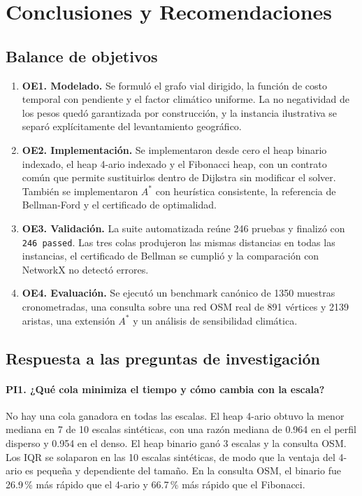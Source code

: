 \section{Conclusiones y Recomendaciones}
\label{sec:conclusiones}

\subsection{Balance de objetivos}
\begin{enumerate}
    \item \textbf{OE1. Modelado.} Se formuló el grafo vial dirigido, la función de costo temporal con pendiente y el factor climático uniforme. La no negatividad de los pesos quedó garantizada por construcción, y la instancia ilustrativa se separó explícitamente del levantamiento geográfico.
    \item \textbf{OE2. Implementación.} Se implementaron desde cero el heap binario indexado, el heap 4-ario indexado y el Fibonacci heap, con un contrato común que permite sustituirlos dentro de Dijkstra sin modificar el solver. También se implementaron $A^*$ con heurística consistente, la referencia de Bellman-Ford y el certificado de optimalidad.
    \item \textbf{OE3. Validación.} La suite automatizada reúne 246 pruebas y finalizó con \texttt{246 passed}. Las tres colas produjeron las mismas distancias en todas las instancias, el certificado de Bellman se cumplió y la comparación con NetworkX no detectó errores.
    \item \textbf{OE4. Evaluación.} Se ejecutó un benchmark canónico de 1350 muestras cronometradas, una consulta sobre una red OSM real de 891 vértices y 2139 aristas, una extensión $A^*$ y un análisis de sensibilidad climática.
\end{enumerate}

\subsection{Respuesta a las preguntas de investigación}
\paragraph{PI1. ¿Qué cola minimiza el tiempo y cómo cambia con la escala?} No hay una cola ganadora en todas las escalas. El heap 4-ario obtuvo la menor mediana en 7 de 10 escalas sintéticas, con una razón mediana de 0.964 en el perfil disperso y 0.954 en el denso. El heap binario ganó 3 escalas y la consulta OSM. Los IQR se solaparon en las 10 escalas sintéticas, de modo que la ventaja del 4-ario es pequeña y dependiente del tamaño. En la consulta OSM, el binario fue 26.9\,\% más rápido que el 4-ario y 66.7\,\% más rápido que el Fibonacci.


